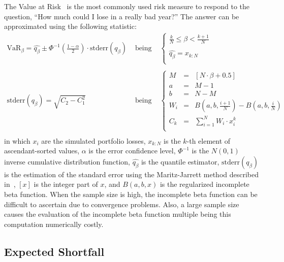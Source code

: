 \documentclass[11pt,fleqn]{book} %
\begin{document}
The Value at Risk~\cite{var:jorion} is the most commonly used risk measure 
to respond to the question, ``How much could I lose in a really bad year?''
The answer can be approximated using the following statistic:
\begin{displaymath}
	\begin{array}{lcl}
		\textrm{VaR}_{\beta} = \widehat{q_{\beta}} \pm \Phi^{-1}\left(\frac{1-\alpha}{2}\right) \cdot \textrm{stderr}(q_{\beta})
		& \text{ being } &
		\left\{
		\begin{array}{l}
			\displaystyle
			\frac{k}{N} \leq \beta < \frac{k+1}{N} \\
			\\
			\displaystyle
			\widehat{q_{\beta}} = x_{k:N} \\
		\end{array}
		\right.
		\\
		& &
		\\
		\textrm{stderr}(q_{\beta}) = \sqrt{C_2 - C_1^2}
		& \text{ being } &
		\left\{
		\begin{array}{rcl}
			M   & = & [N \cdot \beta + 0.5]  \\
			a   & = & M - 1            \\
			b   & = & N - M            \\
			W_i & = & B(a,b,\frac{i+1}{N}) - B(a,b,\frac{i}{N}) \\
			C_k & = & \sum_{i=1}^{N} W_i \cdot x_i^k \\
		\end{array}
		\right.
		\\
	\end{array}
\end{displaymath}
in which $x_i$ are the simulated portfolio losses, $x_{k:N}$ is the $k$-th 
element of ascendant-sorted values, $\alpha$ is the error confidence level, 
$\Phi^{-1}$ is the $N(0,1)$ inverse cumulative distribution function, 
$\widehat{q_{\beta}}$ is the quantile estimator, $\textrm{stderr}(q_{\beta})$ 
is the estimation of the standard error using the Maritz-Jarrett method 
described in~\cite[chap. 3.5.3]{wilcox:2004}, $[x]$ is the integer part of 
$x$, and $B(a,b,x)$ is the regularized incomplete beta function.
When the sample size is high, the incomplete beta function can be difficult 
to ascertain due to convergence problems. Also, a large sample size causes 
the evaluation of the incomplete beta function multiple being this computation
numerically costly.

\subsection{Expected Shortfall}
\end{document}
